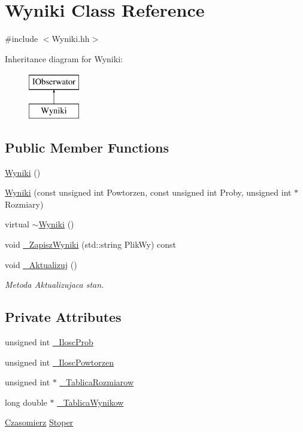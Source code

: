 \hypertarget{class_wyniki}{\section{Wyniki Class Reference}
\label{class_wyniki}
}


{\ttfamily \#include $<$Wyniki.\-hh$>$}

Inheritance diagram for Wyniki\-:\begin{figure}[H]
\begin{center}
\leavevmode
\includegraphics[height=2.000000cm]{class_wyniki}
\end{center}
\end{figure}
\subsection*{Public Member Functions}
\begin{DoxyCompactItemize}
\item 
\hyperlink{class_wyniki_ab5cb499acd382a7e41c294da00648dd4}{Wyniki} ()
\item 
\hyperlink{class_wyniki_a8d370dd59afbd516220a5abbfd5294be}{Wyniki} (const unsigned int Powtorzen, const unsigned int Proby, unsigned int $\ast$Rozmiary)
\item 
virtual \hyperlink{class_wyniki_a0586d35f79012d9961cb4762567357c3}{$\sim$\-Wyniki} ()
\item 
void \hyperlink{class_wyniki_acc5e2bc728f9159a7e244339d84a47c6}{\-\_\-\-Zapisz\-Wyniki} (std\-::string Plik\-Wy) const 
\item 
void \hyperlink{class_wyniki_a4014236438f62cfd90c03de49ea38e5f}{\-\_\-\-Aktualizuj} ()
\begin{DoxyCompactList}\small\item\em Metoda Aktualizujaca stan. \end{DoxyCompactList}\end{DoxyCompactItemize}
\subsection*{Private Attributes}
\begin{DoxyCompactItemize}
\item 
unsigned int \hyperlink{class_wyniki_ac276b321edb9c38043e2b5aba213d847}{\-\_\-\-Ilosc\-Prob}
\item 
unsigned int \hyperlink{class_wyniki_ad207dabc5d9f03c957e1d023276f5548}{\-\_\-\-Ilosc\-Powtorzen}
\item 
unsigned int $\ast$ \hyperlink{class_wyniki_a559a3c3c4374708a493e8636320d9165}{\-\_\-\-Tablica\-Rozmiarow}
\item 
long double $\ast$ \hyperlink{class_wyniki_a6f47caedb424b964c117252febe1f135}{\-\_\-\-Tablica\-Wynikow}
\item 
\hyperlink{class_czasomierz}{Czasomierz} \hyperlink{class_wyniki_ac62ede680255427ef8f51e38e3eddcb9}{Stoper}
\end{DoxyCompactItemize}


